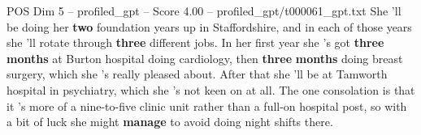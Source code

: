 \begin{textsample}{POS Dim 5 – profiled\_gpt – Score 4.00 – profiled\_gpt/t000061\_gpt.txt}  \label{ex:f5_pos_030}
She ’ll be doing her \textbf{two} foundation years up in Staffordshire, and in each of those years she ’ll rotate through \textbf{three} different jobs.
In her first year she ’s got \textbf{three} \textbf{months} at Burton hospital doing cardiology, then \textbf{three} \textbf{months} doing breast surgery, which she ’s really pleased about.
After that she ’ll be at Tamworth hospital in psychiatry, which she ’s not keen on at all.
The one consolation is that it ’s more of a nine-to-five clinic unit rather than a full-on hospital post, so with a bit of luck she might \textbf{manage} to avoid doing night shifts there.

\end{textsample}
